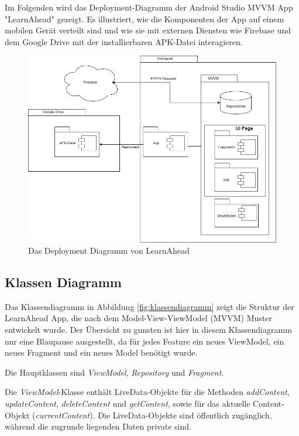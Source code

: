 \noindent
Im Folgenden wird das Deployment-Diagramm der Android Studio \ac{MVVM} App "LearnAhead" gezeigt. Es illustriert, wie die Komponenten der App auf einem mobilen Gerät verteilt sind und wie sie mit externen Diensten wie Firebase und dem Google Drive mit der installierbaren APK-Datei interagieren.\newline
\begin{figure}[H]
    \centering
    \includegraphics[width=1\textwidth]{images/diagramme/DeploymentDiagramm.png}
    \caption{Das Deployment Diagramm von LearnAhead}
    \label{fig:DeploymentDiagramm}
\end{figure}

\subsection{Klassen Diagramm} \label{Klassen Diagramm}
Das Klassendiagramm in Abbildung \ref{fig:klassendiagramm} zeigt die Struktur der LearnAhead App, die nach dem Model-View-ViewModel (MVVM) Muster entwickelt wurde. Der Übersicht zu gunsten ist hier in diesem Klassendiagramm nur eine Blaupause ausgestellt, da für jedes Feature ein neues ViewModel, ein neues Fragment und ein neues Model benötigt wurde.\newline

\noindent
Die Hauptklassen sind \textit{ViewModel}, \textit{Repository} und \textit{Fragment}. \newline

\noindent
Die \textit{ViewModel}-Klasse enthält LiveData-Objekte für die Methoden \textit{addContent}, \textit{updateContent}, \textit{deleteContent} und \textit{getContent}, sowie für das aktuelle Content-Objekt (\textit{currentContent}). Die LiveData-Objekte sind öffentlich zugänglich, während die zugrunde liegenden Daten private sind.\newline

